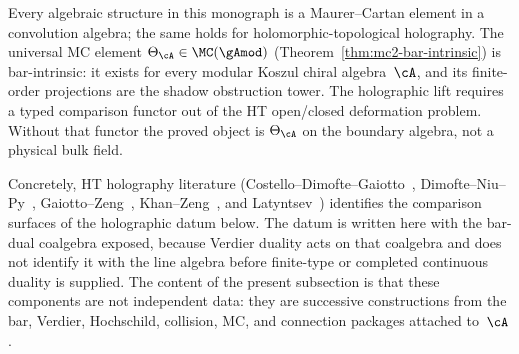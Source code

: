Every algebraic structure in this monograph is a Maurer--Cartan element
in a convolution algebra; the same holds for
holomorphic-topological holography.
The universal MC element $\Theta_\cA \in \MC(\gAmod)$
(Theorem~\ref{thm:mc2-bar-intrinsic}) is bar-intrinsic: it exists for
every modular Koszul chiral algebra~$\cA$, and its finite-order
projections are the shadow obstruction tower. The holographic lift
requires a typed comparison functor out of the HT open/closed
deformation problem. Without that functor the proved object is
$\Theta_\cA$ on the boundary algebra, not a physical bulk field.

Concretely, HT holography
literature (Costello--Dimofte--Gaiotto~\cite{CDG20},
Dimofte--Niu--Py~\cite{DNP25}, Gaiotto--Zeng~\cite{GZ26},
Khan--Zeng~\cite{KhanZeng25}, and
Latyntsev~\cite{Latyntsev23}) identifies the comparison surfaces of
the holographic datum below.  The datum is written here with the bar-dual
coalgebra exposed, because Verdier duality acts on that coalgebra and
does not identify it with the line algebra before finite-type or
completed continuous duality is supplied.  The content of the present
subsection is that these components are not independent data: they are
successive constructions from the bar, Verdier, Hochschild, collision,
MC, and connection packages attached to~$\cA$.

